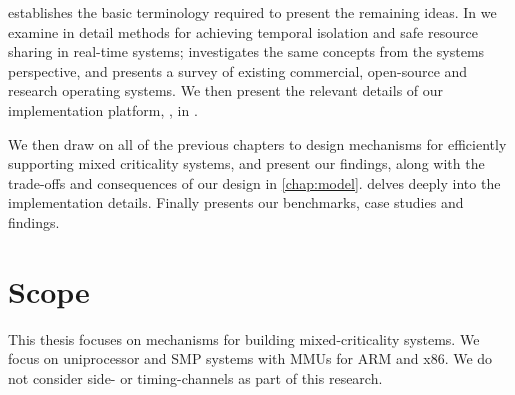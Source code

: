  establishes the basic terminology required to present
the remaining ideas. In  we examine in detail methods for achieving temporal
isolation and safe resource sharing in real-time systems;  investigates
the same concepts from the systems perspective, and presents a survey of existing commercial, open-source
and research operating systems. We then present the relevant details of our implementation platform,
\selfour, in .

We then draw on all of the previous chapters to design mechanisms for efficiently supporting mixed
criticality systems, and present our findings, along with the trade-offs and consequences of our
design in \cref{chap:model}.   delves deeply into the implementation details.
Finally  presents our benchmarks, case studies and findings. 

\section{Scope}

This thesis focuses on mechanisms for building mixed-criticality systems. 
We focus on uniprocessor and \gls{SMP} systems with \glspl{MMU} for ARM and x86.
We do not consider side- or timing-channels as part of this research.

